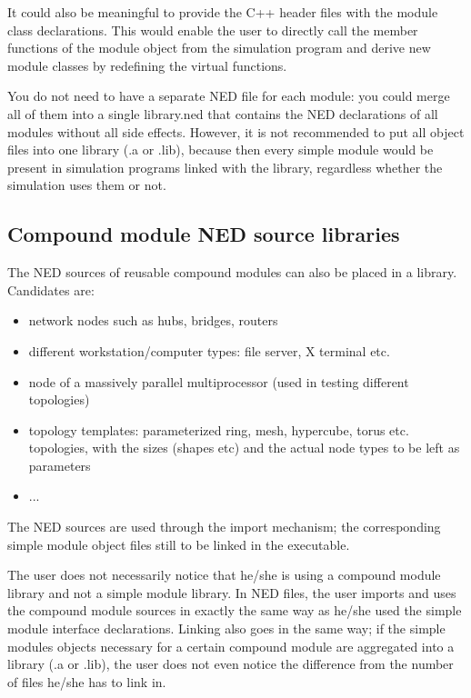 It could also be meaningful to provide the C++ header files with the
module class declarations. This would enable the user to directly call
the member functions of the module object from the simulation program
and derive new module classes by redefining the virtual functions.

You do not need to have a separate NED file for each module: you could
merge all of them into a single library.ned that contains the NED
declarations of all modules without all side effects.  However, it is
not recommended to put all object files into one library (.a or .lib),
because then every simple module would be present
in simulation programs linked with the library, regardless whether the
simulation uses them or not.



\subsection{Compound module NED source libraries}


The NED sources of reusable compound modules
can also be placed in a library. Candidates are:
\begin{itemize}
\item{network nodes such as hubs, bridges, routers}
\item{different workstation/computer types: file server, X terminal
    etc.}
\item{node of a massively parallel multiprocessor (used in testing
    different topologies)}
\item{topology templates: parameterized ring, mesh, hypercube, torus
    etc. topologies, with the sizes (shapes etc) and the actual node
    types to be left as parameters}
\item{...}
\end{itemize}


The NED sources are used through the import
mechanism; the corresponding simple module object
files still to be linked in the executable.

The user does not necessarily notice that he/she is using a
compound module library and not a
simple module library. In NED files, the user
imports and uses the compound module sources in exactly the same way
as he/she used the simple module interface
declarations.  Linking also goes in the same way; if the
simple modules objects necessary for a certain
compound module are aggregated into a library (.a or .lib), the user
does not even notice the difference from the number of files he/she
has to link in.





